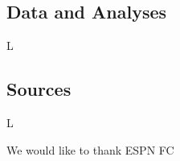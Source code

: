 \documentclass[USenglish]{article}
\begin{document}
\subsection{Data and Analyses} 

L  
 

\subsection{Sources} 

L 
 

\begin{acknowledgement}
We would like to thank ESPN FC
\end{acknowledgement}

%
%
\end{document}
